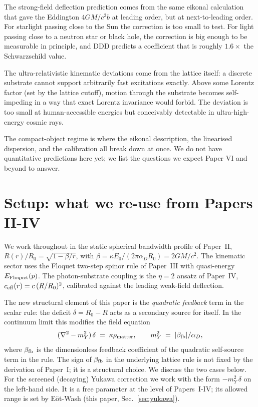 \documentclass[11pt,a4paper]{article}
\begin{document}
The strong-field deflection prediction comes from the same eikonal
calculation that gave the Eddington $4GM/c^2 b$ at leading order, but
at next-to-leading order. For starlight passing close to the Sun the
correction is too small to test. For light passing close to a neutron
star or black hole, the correction is big enough to be measurable in
principle, and DDD predicts a coefficient that is roughly
$1.6\times$ the Schwarzschild value.

The ultra-relativistic kinematic deviations come from the lattice
itself: a discrete substrate cannot support arbitrarily fast
excitations exactly. Above some Lorentz factor (set by the lattice
cutoff), motion through the substrate becomes self-impeding in a way
that exact Lorentz invariance would forbid. The deviation is too
small at human-accessible energies but conceivably detectable in
ultra-high-energy cosmic rays.

The compact-object regime is where the eikonal description, the
linearised dispersion, and the calibration all break down at once. We
do not have quantitative predictions here yet; we list the questions
we expect Paper VI and beyond to answer.

\section{Setup: what we re-use from Papers II-IV}
\label{sec:setup}

We work throughout in the static spherical bandwidth profile of
Paper~II, $R(r)/R_0 = \sqrt{1 - \beta/r}$, with
$\beta = \kappa E_0 / (2\pi \alpha_D R_0) = 2GM/c^2$. The kinematic
sector uses the Floquet two-step spinor rule of Paper~III with
quasi-energy $E_{\rm Floquet}(p)$. The photon-substrate coupling is
the $\eta = 2$ ansatz of Paper~IV,
$c_{\rm eff}(r) = c\,(R/R_0)^2$, calibrated against the leading
weak-field deflection.

The new structural element of this paper is the \emph{quadratic
feedback} term in the scalar rule: the deficit
$\delta = R_0 - R$ acts as a secondary source for itself. In the
continuum limit this modifies the field equation
\[
(\nabla^2 - m_Y^2)\,\delta \;=\; \kappa \rho_{\rm matter},
\qquad m_Y^2 \;=\; |\beta_{\rm fb}|/\alpha_D,
\]
where $\beta_{\rm fb}$ is the dimensionless feedback coefficient
of the quadratic self-source term in the rule. The sign of
$\beta_{\rm fb}$ in the underlying lattice rule is not fixed
by the derivation of Paper~I; it is a structural choice. We
discuss the two cases below. For the screened (decaying) Yukawa
correction we work with the form $-m_Y^2\,\delta$ on the
left-hand side. It is a free
parameter at the level of Papers~I-IV; its allowed range is set by
E\"{o}t-Wash (this paper, Sec.~\ref{sec:yukawa}).
\end{document}
